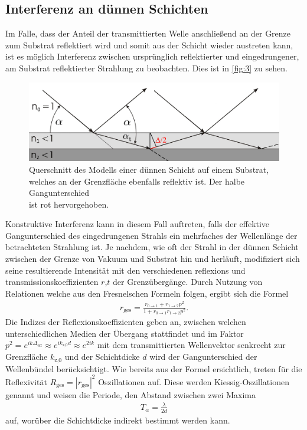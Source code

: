 \documentclass[12pt]{article}
\begin{document}
\subsection{Interferenz an dünnen Schichten}
Im Falle, dass der Anteil der transmittierten Welle anschließend an der Grenze zum Substrat reflektiert wird und somit aus der Schicht wieder austreten kann, ist es möglich Interferenz zwischen ursprünglich reflektierter und eingedrungener, am Substrat reflektierter Strahlung zu beobachten. Dies ist in \autoref{fig:3} zu sehen.
\begin{figure}[H]
  \centering
  \includegraphics[scale=0.3]{Ressourcen/schicht.png}
  \caption{Querschnitt des Modells einer dünnen Schicht auf einem Substrat,\\ welches an der Grenzfläche ebenfalls reflektiv ist. Der halbe Gangunterschied \\ ist rot hervorgehoben.}\label{fig:3}
\end{figure}
Konstruktive Interferenz kann in diesem Fall auftreten, falls der effektive Gangunterschied des eingedrungenen Strahls ein mehrfaches der Wellenlänge der betrachteten Strahlung ist.
Je nachdem, wie oft der Strahl in der dünnen Schicht zwischen der Grenze von Vakuum und Substrat hin und herläuft, modifiziert sich seine resultierende Intensität mit den verschiedenen reflexions und transmissionskoeffizienten $r$,$t$ der Grenzübergänge.
Durch Nutzung von Relationen welche aus den Fresnelschen Formeln folgen, ergibt sich die Formel
\begin{align}
  r_\text{ges}= \frac{r_{0\to1}+r_{1\to2}p^2}{1+r_{0\to1}r_{1\to2}p^2}\text{.}\label{eqn:schicht}
\end{align}
Die Indizes der Reflexionskoeffizienten geben an, zwischen welchen unterschiedlichen Medien der Übergang stattfindet und im Faktor $p^2=e^{ik\Delta_\text{eff}}\approx e^{ik_\text{z,0}d} \approx e^{2ik}$ mit dem transmittierten Wellenvektor senkrecht zur Grenzfläche $k_\text{z,0}$ und der Schichtdicke $d$ wird der Gangunterschied der Wellenbündel berücksichtigt.
Wie bereits aus der Formel ersichtlich, treten für die Reflexivität $R_\text{ges}=|r_\text{ges}|^2$ Oszillationen auf.
Diese werden Kiessig-Oszillationen genannt und weisen die Periode, den Abstand zwischen zwei Maxima 
\begin{align}
  T_\alpha = \frac{\lambda}{2d}
\end{align}
auf, worüber die Schichtdicke indirekt bestimmt werden kann\cite{kiessig}.
\end{document}
